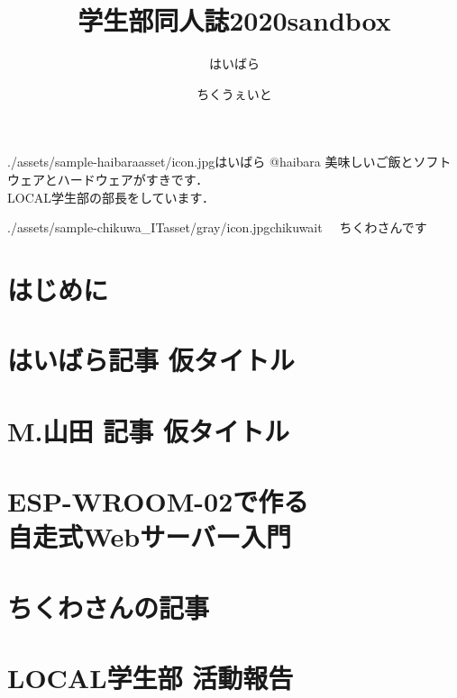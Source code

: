 \documentclass[autodetect-engine,dvipdfmx-if-dvi,ja=standard,b5paper,10.5pt,twoside,openany,layout=v2]{bxjsbook}
\title{学生部同人誌2020sandbox}
\author{はいばら \and ちくうぇいと }
\date{}
\newcommand{\articlepath}{./articles}
\newcommand{\assetspath}{./assets}
\newcommand{\chikuwaitasset}{\assetspath/sample-chikuwa_ITasset/gray}
\newcommand{\haibaraasset}{\assetspath/sample-haibaraasset}
\begin{document}
\frontmatter
\maketitle
\begin{myintroduce}{\haibaraasset/icon.jpg}{はいばら @haibara}
  美味しいご飯とソフトウェアとハードウェアがすきです．\\
  LOCAL学生部の部長をしています．
\end{myintroduce}
\begin{myintroduce}{\chikuwaitasset/icon.jpg}{chikuwait}
　ちくわさんです
\end{myintroduce}


\chapter{はじめに}
\addtolength{\oddsidemargin}{10pt}
\addtolength{\evensidemargin}{-10pt}


\tableofcontents
\mainmatter

\chapter{はいばら記事 仮タイトル}


\chapter{M.山田 記事 仮タイトル}


\chapter{ESP-WROOM-02で作る \\自走式Webサーバー入門}


\chapter{ちくわさんの記事}


\chapter{LOCAL学生部 活動報告}

  
\newpage
\myimpression[%
name=LOCAL Students\\情報ボーイズの寄稿ノート 2.0, %
author=はいばら， \and %
ちくうぇいと, %
date=2020年5月3日, %
publisher=LOCAL学生部, %
print=有限会社ねこのしっぽ %
]%
\end{document}

